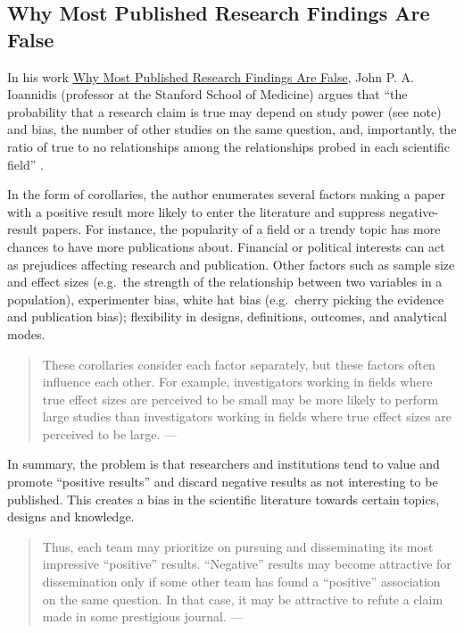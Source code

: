 \documentclass[
]{book}
\begin{document}
\hypertarget{why-most-published-research-findings-are-false}{%
\subsection{Why Most Published Research Findings Are False}\label{why-most-published-research-findings-are-false}}

In his work \href{https://doi.org/10.1371/journal.pmed.0020124}{Why Most Published Research Findings Are False}, John P. A. Ioannidis (professor at the Stanford School of Medicine) argues that ``the probability that a research claim is true may depend on study power (see note) and bias, the number of other studies on the same question, and, importantly, the ratio of true to no relationships among the relationships probed in each scientific field'' \citep{ioannidis2005most}.

In the form of corollaries, the author enumerates several factors making a paper with a positive result more likely to enter the literature and suppress negative-result papers. For instance, the popularity of a field or a trendy topic has more chances to have more publications about. Financial or political interests can act as prejudices affecting research and publication. Other factors such as sample size and effect sizes (e.g.~the strength of the relationship between two variables in a population), experimenter bias, white hat bias (e.g.~cherry picking the evidence and publication bias); flexibility in designs, definitions, outcomes, and analytical modes.

\begin{quote}
These corollaries consider each factor separately, but these factors often influence each other. For example, investigators working in fields where true effect sizes are perceived to be small may be more likely to perform large studies than investigators working in fields where true effect sizes are perceived to be large. --- \citep{ioannidis2005most}
\end{quote}

In summary, the problem is that researchers and institutions tend to value and promote ``positive results'' and discard negative results as not interesting to be published. This creates a bias in the scientific literature towards certain topics, designs and knowledge.

\begin{quote}
Thus, each team may prioritize on pursuing and disseminating its most impressive ``positive'' results. ``Negative'' results may become attractive for dissemination only if some other team has found a ``positive'' association on the same question. In that case, it may be attractive to refute a claim made in some prestigious journal. --- \citep{ioannidis2005most}
\end{quote}
\end{document}
